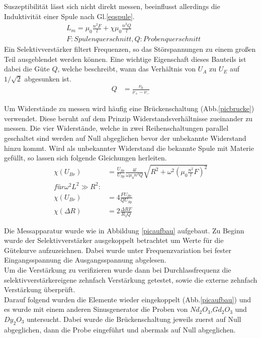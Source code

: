 Suszeptibilität lässt sich nicht direkt messen, beeinflusst allerdings die Induktivität einer
Spule nach Gl.\ref{eqspule}.
\begin{align}
&L_m=\mu_0 \frac{n^2 F}{l} + \chi \mu_0 \frac{n^2 Q}{l} \label{eqspule} \\
&F: Spulenquerschnitt, Q: Probenquerschnitt \nonumber
\end{align}
Ein Selektivverstärker filtert Frequenzen, so das Störspannungen zu einem großen Teil ausgeblendet 
werden können. Eine wichtige Eigenschaft dieses Bauteils ist dabei die Güte $Q$, welche beschreibt, 
wann das Verhältnis von $U_A$ zu $U_E$ auf $1/\sqrt{2}$ abgesunken ist.
\begin{align}
Q&=\frac{\nu_0}{\nu_+ - \nu_-} \label{eqn:engute}
\end{align}

\FloatBarrier
Um Widerstände zu messen wird häufig eine Brückenschaltung (Abb.\ref{picbrucke}) verwendet. Diese beruht auf dem Prinzip 
Widerstandsverhältnisse zueinander zu messen. Die vier Widerstände, welche in zwei Reihenschaltungen
parallel geschaltet sind werden auf Null abgeglichen bevor der unbekannte Widerstand hinzu kommt. 
Wird als unbekannter Widerstand die bekannte Spule mit Materie gefüllt, so lassen sich folgende Gleichungen
herleiten.
\begin{align}
\chi(U_{Br})&=\frac{U_{Br}}{U_{Sp}}\frac{4l}{\omega \mu_0 n^2 Q} \sqrt{R^2 + \omega^2 (\mu_0 \frac{n^2}{l} F)^2} \label{eqn:chibrucke}\\
für \omega^2 L^2 \gg R^2 : \nonumber \\
\chi(U_{Br})&=4 \frac{F U_{Br}}{Q U_{Sp}} \label{eqchiu}\\
\chi(\Delta R)&=2 \frac{\Delta R F}{R_3 Q} \label{eqchir}
\end{align}

Die Messapparatur wurde wie in Abbildung \ref{picaufbau} aufgebaut. Zu Beginn wurde der Selektivverstärker
ausgekoppelt betrachtet um Werte für die Gütekurve aufzuzeichnen. Dabei wurde unter Frequenzvariation bei 
fester Eingangsspannung die Ausgangsspannung abgelesen. \\ 
Um die Verstärkung zu verifizieren wurde dann bei Durchlassfrequenz die selektivverstärkereigene zehnfach 
Verstärkung getestet, sowie die externe zehnfach Verstärkung überprüft.\\
Darauf folgend wurden die Elemente wieder eingekoppelt (Abb.\ref{picaufbau}) und es wurde mit einem anderen 
Sinusgenerator die Proben von $Nd_2O_3$,$Gd_2O_3$ und $Dy_2O_3$ untersucht. Dabei wurde die Brückenschaltung
jeweils zuerst auf Null abgeglichen, dann die Probe eingeführt und abermals auf Null abgeglichen.

